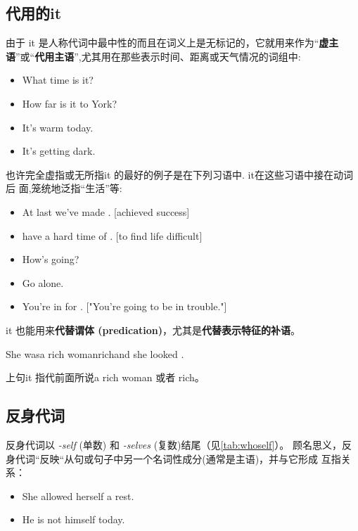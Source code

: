 \subsection{代用的it}

由于 it 是人称代词中最中性的而且在词义上是无标记的，它就用来作为“\textbf{虚主
  语}”或“\textbf{代用主语}”,尤其用在那些表示时间、距离或天气情况的词组中:
\begin{itemize}
\item What time is it?
\item How far is it to York?
\item It's warm today.
\item It's getting dark.
\end{itemize}

也许完全虚指或无所指it 的最好的例子是在下列习语中. it在这些习语中接在动词后
面,笼统地泛指“生活”等:
\begin{itemize}
\item At last we've made . [achieved success]
\item have a hard time of . [to find life difficult]
\item How's  going?
\item Go  alone.
\item You're in for . ["You're going to be in trouble."]
\end{itemize}

it 也能用来\textbf{代替谓体 (predication)}，尤其是\textbf{代替表示特征的补语}。
\begin{sdbig4}{She was}{a rich woman}{rich}{and she looked .}
\end{sdbig4}

上句it 指代前面所说a rich woman 或者 rich。

\subsection{反身代词}
反身代词以 \emph{-self} (单数) 和 \emph{-selves} (复数)结尾（见\cref{tab:whoself}）。
顾名思义，反身代词“反映“从句或句子中另一个名词性成分(通常是主语)，并与它形成
互指关系：
\begin{itemize}
\item She allowed herself a rest.
\item He is not himself today.
\end{itemize}


